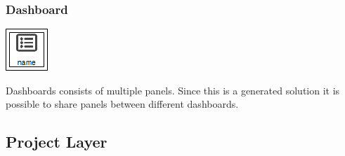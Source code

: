 \subsubsection{Dashboard}
\noindent\begin{minipage}{0.15\textwidth}%
\includegraphics[width=\linewidth]{assets/images/dashboard}
\end{minipage}%
\hfill%
\begin{minipage}{0.8\textwidth}
	Dashboards consists of multiple panels. Since this is a generated solution it is possible to share panels between different dashboards. 
\end{minipage}



\subsection{Project Layer}

